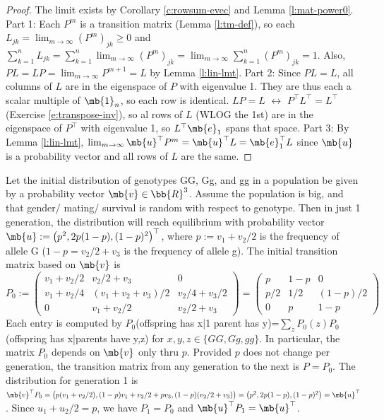 \begin{proof}%
The limit exists by Corollary \ref{c:rowsum-evec} and Lemma \ref{l:mat-power0}.\\
Part 1: Each $P^m$ is a transition matrix (Lemma \ref{l:tm-def}), so each $L_{jk}= \lim_{m \to \infty}(P^m)_{jk}\geq 0$ and $\sum_{k=1}^nL_{jk}= \sum_{k=1}^n \lim_{m \to \infty}(P^m)_{jk}= \lim_{m \to \infty}\sum_{k=1}^n(P^m)_{jk}=1$.
Also, $PL=LP= \lim_{m \to \infty}P^{m+1}=L$ by Lemma \ref{l:lin-lmt}.
Part 2: Since $PL=L$, all columns of $L$ are in the eigenspace of $P$ with eigenvalue 1. They are thus each a scalar multiple of $\mb{1}_n$, so each row is identical.
$LP=L$ $\leftrightarrow$ $P^\top L^\top =L^\top$ (Exercise \ref{e:transpose-inv}), so al rows of $L$ (WLOG the 1st) are in the eigenspace of $P^\top$ with eigenvalue 1, so $L^\top \mb{e}_1$ spans that space.
Part 3: By Lemma \ref{l:lin-lmt}, $\lim_{m \to \infty}\mb{u}^\top P^m= \mb{u}^\top L= \mb{e}_1^\top L$ since $\mb{u}$ is a probability vector and all rows of $L$ are the same.
\end{proof}
\begin{example}
Let the initial distribution of genotypes GG, Gg, and gg in a population be given by a probability vector $\mb{v}\in \bb{R}^3$. Assume the population is big, and that gender/ mating/ survival is random with respect to genotype.
Then in just 1 generation, the distribution will reach equilibrium with probability vector $\mb{u}:= \big( p^2,2p(1-p),(1-p)^2 \big)^\top$, where $p:=v_1+v_2/2$ is the frequency of allele G ($1-p=v_2/2+v_3$ is the frequency of allele g).
The initial transition matrix based on $\mb{v}$ is
\[ P_0:= \begin{pmatrix} v_1+v_2/2 & v_2/2+v_3 & 0 \\
v_1+v_2/4 & (v_1+v_2+v_3)/2 & v_2/4+v_3/2 \\
0 & v_1+v_2/2 & v_2/2+v_3 \end{pmatrix}= \begin{pmatrix} p & 1-p & 0 \\
p/2 & 1/2 & (1-p)/2 \\
0 & p & 1-p \end{pmatrix}\]
Each entry is computed by $P_0$(offspring has x|1 parent has y)=$\sum_zP_0(z)P_0$(offspring has x|parents have y,z) for $x,y,z \in \{ GG, Gg, gg \}$.
In particular, the matrix $P_0$ depends on $\mb{v}$ only thru $p$. Provided $p$ does not change per generation, the transition matrix from any generation to the next is $P=P_0$.
The distribution for generation 1 is $\mb{v}^\top P_0= \big( p(v_1+v_2/2),(1-p)v_1+v_2/2+pv_3,(1-p)(v_2/2+v_3) \big) = \big( p^2,2p(1-p),(1-p)^2 \big) = \mb{u}^\top$.
Since $u_1+u_2/2=p$, we have $P_1=P_0$ and $\mb{u}^\top P_1= \mb{u}^\top$.
\end{example}

